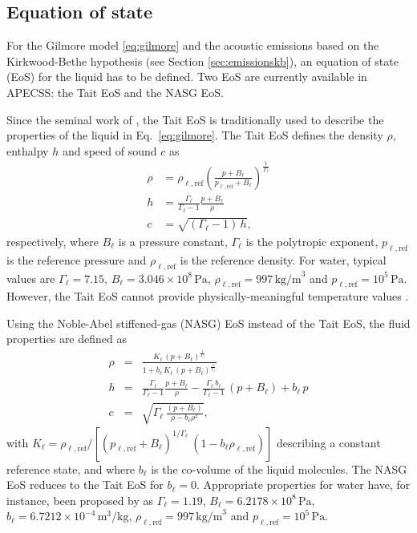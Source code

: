 \subsection{Equation of state}

For the Gilmore model \eqref{eq:gilmore} and the acoustic emissions based on the Kirkwood-Bethe hypothesis (see Section \ref{sec:emissionskb}), an equation of state (EoS) for the liquid has to be defined. Two EoS are currently available in APECSS: the Tait EoS and the NASG EoS. 

Since the seminal work of \citet{Gilmore1952}, the Tait EoS is traditionally used to describe the properties of the liquid in Eq.~\eqref{eq:gilmore}. The Tait EoS defines the density $\rho$, enthalpy $h$ and speed of sound $c$ as
\begin{align}
    \rho &= \rho_{\ell,\text{ref}} \left( \frac{p+B_\ell}{p_{\ell,\text{ref}}+B_\ell}\right)^{\frac{1}{\Gamma_\ell}} \label{eq:rho_Tait} \\
    h &= \frac{\Gamma_\ell}{\Gamma_\ell-1} \frac{p+B_\ell}{\rho} \label{eq:h_Tait} \\
    c &= \sqrt{(\Gamma_\ell -1) \, h}, \label{eq:c_Tait}
\end{align}
respectively, where $B_\ell$ is a pressure constant, $\Gamma_\ell$ is the polytropic exponent, $p_{\ell,\text{ref}}$ is the reference pressure and $\rho_{\ell,\text{ref}}$ is the reference density. For water, typical values are $\Gamma_\ell=7.15$, $B_\ell=3.046 \times 10^8 \, \text{Pa}$, $\rho_{\ell,\text{ref}} = 997 \, \mathrm{kg/m}^3$ and $p_{\ell,\text{ref}} = 10^5 \, \mathrm{Pa}$. However, the Tait EoS cannot provide physically-meaningful temperature values \citep{Radulescu2020}. 

Using the Noble-Abel stiffened-gas (NASG) EoS \citep{LeMetayer2016} instead of the Tait EoS, the fluid properties are defined as \citep{Denner2021}
 \begin{eqnarray}
    \rho &=& \frac{K_\ell \, (p+B_\ell)^{\frac{1}{\Gamma_\ell}}}{1+b_\ell \, K_\ell \,  (p+B_\ell)^{\frac{1}{\Gamma_\ell}}} \label{eq:rho_NASG}\\
      h &=& \frac{\Gamma_\ell}{\Gamma_\ell-1} \frac{p+B_\ell}{\rho} - \frac{\Gamma_\ell \, b_\ell}{\Gamma_\ell-1} \, (p+B_\ell) + b_\ell \, p \label{eq:h_NASG} \\
      c &=&\sqrt{\Gamma_\ell \, \frac{(p+B_\ell)}{\rho-b_\ell  \rho^2}},\label{eq:c_NASG}
    \end{eqnarray}
with $K_\ell = \rho_{\ell,\text{ref}}/[(p_{\ell,\text{ref}}+B_\ell)^{{1/\Gamma_\ell}} \ (1-b_\ell \rho_{\ell,\text{ref}})]$ describing a constant reference state, and where $b_\ell$ is the co-volume of the liquid molecules. The NASG EoS reduces to the Tait EoS for $b_\ell=0$. Appropriate properties for water have, for instance, been proposed by \citet{Chandran2019} as $\Gamma_\ell = 1.19$, $B_\ell = 6.2178 \times 10^{8} \, \mathrm{Pa}$, $b_\ell = 6.7212 \times 10^{-4} \, \mathrm{m}^3/\mathrm{kg}$, $\rho_{\ell,\text{ref}} = 997 \, \mathrm{kg/m}^3$ and $p_{\ell,\text{ref}} = 10^5 \, \mathrm{Pa}$.

